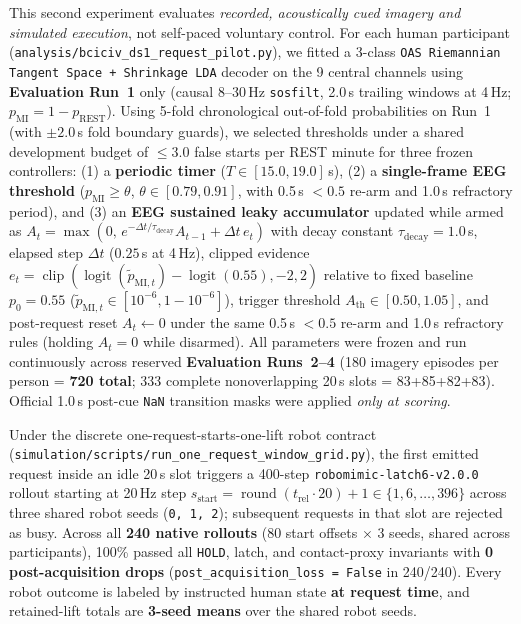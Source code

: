 \documentclass{article}
\begin{document}
This second experiment evaluates \emph{recorded, acoustically cued imagery and simulated execution}, not self-paced voluntary control. For each human participant (\texttt{analysis/bciciv\_ds1\_request\_pilot.py}), we fitted a 3-class \texttt{OAS Riemannian Tangent Space + Shrinkage LDA} decoder on the 9 central channels using \textbf{Evaluation Run~1} only (causal 8--30\,Hz \texttt{sosfilt}, 2.0\,s trailing windows at 4\,Hz; $p_{\text{MI}} = 1 - p_{\text{REST}}$). Using 5-fold chronological out-of-fold probabilities on Run~1 (with $\pm 2.0$\,s fold boundary guards), we selected thresholds under a shared development budget of $\le 3.0$ false starts per REST minute for three frozen controllers: (1) a \textbf{periodic timer} ($T \in [15.0, 19.0]$\,s), (2) a \textbf{single-frame EEG threshold} ($p_{\text{MI}} \ge \theta$, $\theta \in [0.79, 0.91]$, with 0.5\,s $< 0.5$ re-arm and 1.0\,s refractory period), and (3) an \textbf{EEG sustained leaky accumulator} updated while armed as $A_t = \max(0,\, e^{-\Delta t / \tau_{\text{decay}}} A_{t-1} + \Delta t\, e_t)$ with decay constant $\tau_{\text{decay}} = 1.0$\,s, elapsed step $\Delta t$ ($0.25$\,s at 4\,Hz), clipped evidence $e_t = \operatorname{clip}(\operatorname{logit}(\tilde{p}_{\text{MI},t}) - \operatorname{logit}(0.55), -2, 2)$ relative to fixed baseline $p_0 = 0.55$ ($\tilde{p}_{\text{MI},t} \in [10^{-6}, 1-10^{-6}]$), trigger threshold $A_{\text{th}} \in [0.50, 1.05]$, and post-request reset $A_t \leftarrow 0$ under the same 0.5\,s $< 0.5$ re-arm and 1.0\,s refractory rules (holding $A_t = 0$ while disarmed). All parameters were frozen and run continuously across reserved \textbf{Evaluation Runs~2--4} (180 imagery episodes per person = \textbf{720 total}; 333 complete nonoverlapping 20\,s slots = 83+85+82+83). Official 1.0\,s post-cue \texttt{NaN} transition masks were applied \emph{only at scoring}.

Under the discrete one-request-starts-one-lift robot contract (\texttt{simulation/\allowbreak scripts/\allowbreak run\_one\_\allowbreak request\_\allowbreak window\_\allowbreak grid.py}), the first emitted request inside an idle 20\,s slot triggers a 400-step \texttt{robomimic-latch6-v2.0.0} rollout starting at 20\,Hz step $s_{\text{start}} = \operatorname{round}(t_{\text{rel}} \cdot 20) + 1 \in \{1, 6, \dots, 396\}$ across three shared robot seeds (\texttt{0, 1, 2}); subsequent requests in that slot are rejected as busy. Across all \textbf{240 native rollouts} (80 start offsets $\times$ 3 seeds, shared across participants), 100\% passed all \texttt{HOLD}, latch, and contact-proxy invariants with \textbf{0 post-acquisition drops} (\texttt{post\_acquisition\_loss = False} in 240/240). Every robot outcome is labeled by instructed human state \textbf{at request time}, and retained-lift totals are \textbf{3-seed means} over the shared robot seeds.
\end{document}
